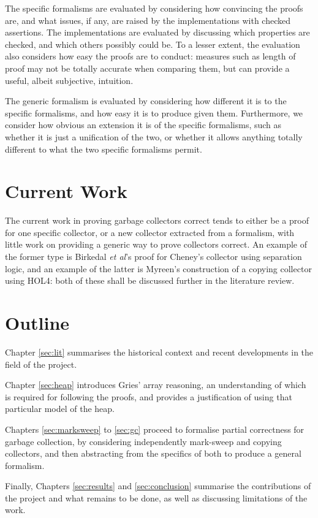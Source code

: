 The specific formalisms are evaluated by considering how convincing
the proofs are, and what issues, if any, are raised by the
implementations with checked assertions. The implementations are
evaluated by discussing which properties are checked, and which others
possibly could be. To a lesser extent, the evaluation also considers
how easy the proofs are to conduct: measures such as length of proof
may not be totally accurate when comparing them, but can provide a
useful, albeit subjective, intuition.

The generic formalism is evaluated by considering how different it is
to the specific formalisms, and how easy it is to produce given
them. Furthermore, we consider how obvious an extension it is of the
specific formalisms, such as whether it is just a unification of the
two, or whether it allows anything totally different to what the two
specific formalisms permit.

\section{Current Work}
\label{sec:intro-current}

The current work in proving garbage collectors correct tends to either
be a proof for one specific collector, or a new collector extracted
from a formalism, with little work on providing a generic way to prove
collectors correct. An example of the former type is Birkedal
\textit{et al}'s\cite{Birkedal04} proof for Cheney's collector using
separation logic, and an example of the latter is
Myreen's\cite{Myreen10} construction of a copying collector using
HOL4: both of these shall be discussed further in the literature
review.
\section{Outline}
\label{sec:intro-outline}

Chapter \ref{sec:lit} summarises the historical context and recent
developments in the field of the project.

Chapter \ref{sec:heap} introduces Gries' array
reasoning\cite{Gries87}, an understanding of which is required for
following the proofs, and provides a justification of using that
particular model of the heap.

Chapters \ref{sec:marksweep} to \ref{sec:gc} proceed to formalise
partial correctness for garbage collection, by considering
independently mark-sweep and copying collectors, and then abstracting
from the specifics of both to produce a general formalism.

Finally, Chapters \ref{sec:results} and \ref{sec:conclusion} summarise
the contributions of the project and what remains to be done, as well
as discussing limitations of the work.
